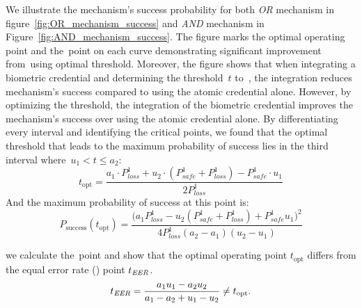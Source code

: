\documentclass[conference,compsoc]{IEEEtran}
\begin{document}
We illustrate the mechanism's success probability for both \emph{OR} mechanism in figure~\ref{fig:OR_mechanism_success} and \emph{AND} mechanism in Figure~\ref{fig:AND_mechanism_success}. The figure marks the optimal operating point and the~\EER point on each curve demonstrating significant improvement from~\EER using optimal threshold. Moreover, the figure shows that when integrating a biometric credential and determining the threshold~$t$ to~\EER, the integration reduces mechanism's success compared to using the atomic credential alone. However, by optimizing the threshold, the integration of the biometric credential improves the mechanism's success over using the atomic credential alone.  
By differentiating every interval and identifying the critical points, we found that the optimal threshold that leads to the maximum probability of success lies in the third interval where~$u_1 < t \le a_2$:
\[t_{\text{opt}} = \frac{a_1\cdot{P^1_{loss}} + u_2\cdot({P^1_{safe}} + {P^1_{loss}}) - P^1_{safe}\cdot u_1}{2{P^1_{loss}}}\]
And the maximum probability of success at this point is:
\[P_{\text{success}}(t_{\text{opt}}) = \frac{\big(a_1 {P^1_{loss}} - u_2 ({P^1_{safe}} + {P^1_{loss}}) + {P^1_{safe}} u_1\big)^2}
{4 {P^1_{loss}} (a_2 - a_1)(u_2 - u_1)}\]

we calculate the~\EER point and show that the optimal operating point $t_{\text{opt}}$ differs from the equal error rate (\EER) point $t_{\textit{EER}}$.
\[t_{\textit{EER}} = \frac{a_1 u_1 - a_2 u_2}{a_1 - a_2 + u_1 - u_2} \neq t_{\text{opt}}.\]
\end{document}
